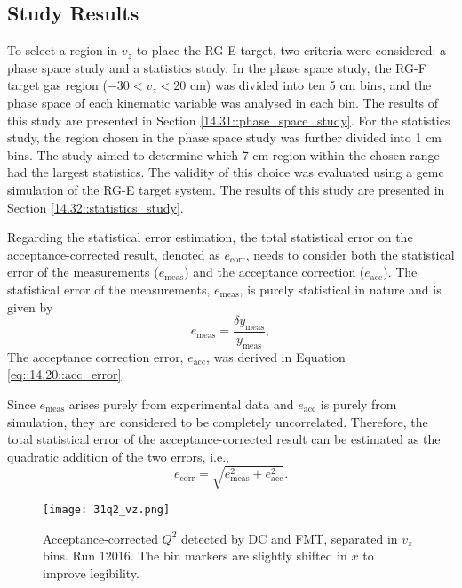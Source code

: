 \subsection{Study Results}
\label{14.30::study_results}
    To select a region in $v_z$ to place the RG-E target, two criteria were considered: a phase space study and a statistics study.
    In the phase space study, the RG-F target gas region ($-30 < v_z < 20$ cm) was divided into ten 5 cm bins, and the phase space of each kinematic variable was analysed in each bin.
    The results of this study are presented in Section \ref{14.31::phase_space_study}.
    For the statistics study, the region chosen in the phase space study was further divided into 1 cm bins.
    The study aimed to determine which 7 cm region within the chosen range had the largest statistics.
    The validity of this choice was evaluated using a gemc simulation of the RG-E target system.
    The results of this study are presented in Section \ref{14.32::statistics_study}.

    Regarding the statistical error estimation, the total statistical error on the acceptance-corrected result, denoted as $e_\text{corr}$, needs to consider both the statistical error of the measurements ($e_\text{meas}$) and the acceptance correction ($e_\text{acc}$).
    The statistical error of the measurements, $e_\text{meas}$, is purely statistical in nature and is given by
    \begin{equation*}
        e_\text{meas} = \frac{\delta y_\text{meas}}{y_\text{meas}},
    \end{equation*}
    The acceptance correction error, $e_\text{acc}$, was derived in Equation \eqref{eq::14.20::acc_error}.

    Since $e_\text{meas}$ arises purely from experimental data and $e_\text{acc}$ is purely from simulation, they are considered to be completely uncorrelated.
    Therefore, the total statistical error of the acceptance-corrected result can be estimated as the quadratic addition of the two errors, i.e.,
    \begin{equation*}
        e_\text{corr} = \sqrt{e_\text{meas}^2 + e_\text{acc}^2}.
    \end{equation*}

    
    

    \begin{figure}
        \centering
        \texttt{[image: 31q2\_vz.png]}
        \caption[Acceptance-corrected $Q^2$ separated in $v_z$ bins]
        {Acceptance-corrected $Q^2$ detected by DC and FMT, separated in $v_z$ bins.
        Run 12016.
        The bin markers are slightly shifted in $x$ to improve legibility.}
        \label{fig::14.31::q2_vz}
    \end{figure}

